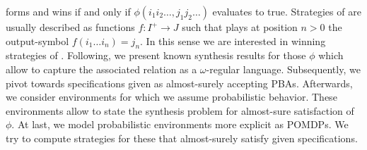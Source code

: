 forms and \outputp{} wins if and only if 
$\phi(i_{1}i_{2}\dots,j_{1}j_{2}\dots)$ evaluates to true. Strategies of 
\outputp{} are usually described as functions $f:I^{+}\rightarrow J$ such that
\outputp{} plays at position $n>0$ the output-symbol 
$f(i_{1}\dots i_{n}) = j_{n}$. In this sense we are interested in winning 
strategies of \outputp{}. Following, we present known synthesis results 
for those $\phi$ which allow to capture the associated relation as a 
$\omega$-regular language. Subsequently, we pivot towards specifications given
as almost-surely accepting \acp{PBA}. Afterwards, we consider environments for
which we assume probabilistic behavior. These environments allow to state the
synthesis problem for almost-sure satisfaction of $\phi$. At last, we model
probabilistic environments more explicit as \acp{POMDP}. We try to compute
strategies for these that almost-surely satisfy given specifications.

